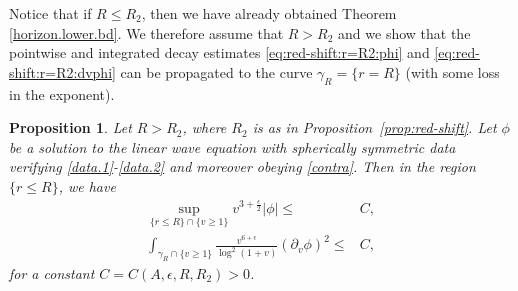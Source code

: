 \documentclass[12 pt, reqno]{amsart}
\newtheorem{proposition}[theorem]{Proposition}
\theoremstyle{definition}
\theoremstyle{remark}
\numberwithin{equation}{section}
\newcommand{\abs}[1]{\vert#1\vert}
\newcommand{\set}[1]{\{#1\}}
\newcommand{\rd}{\partial}
\newcommand{\0}{\emptyset}
\newcommand{\gmm}{\gamma}
\newcommand{\eps}{\epsilon}
\begin{document}
Notice that if $R\leq R_2$, then we have already obtained Theorem \ref{horizon.lower.bd}. We therefore assume that $R>R_2$ and we show that the pointwise and integrated decay estimates \eqref{eq:red-shift:r=R2:phi} and \eqref{eq:red-shift:r=R2:dvphi} can be propagated to the curve $\gmm_{R} = \set{r = R}$ (with some loss in the exponent).
\begin{proposition} \label{prop:r=R}
Let $R > R_{2}$, where $R_{2}$ is as in Proposition~\ref{prop:red-shift}. Let $\phi$ be a solution to the linear wave equation with spherically symmetric data verifying \eqref{data.1}-\eqref{data.2} and moreover obeying \eqref{contra}. Then in the region $\set{r \leq R}$, we have 
\begin{align} 
	\sup_{\set{r \leq R} \cap \set{v \geq 1}} v^{3 + \frac{\eps}{2}} \abs{\phi} 
	\leq& C, \label{eq:r=R:phi} \\
	\int_{\gmm_{R} \cap \set{v \geq 1}} \frac{v^{6+\eps}}{\log^{2}(1+v)} (\rd_{v} \phi)^{2}
	 \leq& C, \label{eq:r=R:dvphi}
\end{align}
for a constant $C = C(A, \eps, R, R_{2}) > 0$.
\end{proposition}
\end{document}
